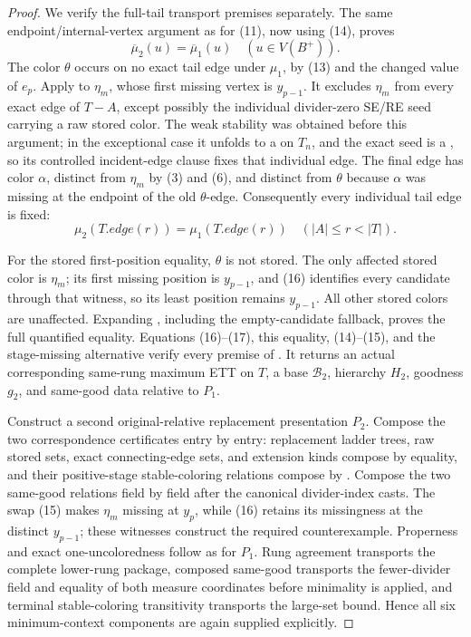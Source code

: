 \begin{proof}
We verify the full-tail transport premises separately.  The same
endpoint/internal-vertex argument as for (11), now using (14), proves
\[
 \overline\mu_2(u)=\overline\mu_1(u)
                    \quad(u\in V(B^+)).                     \tag{16}
\]
The color \(\theta\) occurs on no exact tail edge under \(\mu_1\), by
(13) and the changed value of \(e_p\).  Apply
 to \(\eta_m\), whose first
missing vertex is \(y_{p-1}\).  It excludes \(\eta_m\) from every exact
edge of \(T-A\), except possibly the individual divider-zero SE/RE seed
carrying a raw stored color.  The weak stability was obtained before this
argument; in the exceptional case it unfolds to a
 on \(T_n\), and the exact seed is a
, so its controlled incident-edge clause fixes
that individual edge.  The final edge has color \(\alpha\), distinct
from \(\eta_m\) by (3) and (6), and distinct from \(\theta\) because
\(\alpha\) was missing at the endpoint of the old \(\theta\)-edge.
Consequently every individual tail edge is fixed:
\[
 \mu_2(T.\mathit{edge}(r))=\mu_1(T.\mathit{edge}(r))
                    \quad(|A|\le r<|T|).                    \tag{17}
\]

For the stored first-position equality, \(\theta\) is not stored.  The
only affected stored color is \(\eta_m\); its first missing position is
\(y_{p-1}\), and (16) identifies every candidate through that witness,
so its least position remains \(y_{p-1}\).  All other stored colors are
unaffected.  Expanding , including
the empty-candidate fallback, proves the full quantified equality.
Equations (16)--(17), this equality, (14)--(15), and the stage-missing
alternative verify every premise of
.  It returns an actual
corresponding same-rung maximum ETT on \(T\), a base
\(\mathcal B_2\), hierarchy \(H_2\), goodness \(g_2\), and same-good
data relative to \(P_1\).

Construct a second original-relative replacement presentation \(P_2\).
Compose the two correspondence certificates entry by entry: replacement
ladder trees, raw stored sets, exact connecting-edge sets, and extension
kinds compose by equality, and their positive-stage stable-coloring
relations compose by .  Compose the two same-good relations
field by field after the canonical divider-index casts.  The swap (15)
makes \(\eta_m\) missing at \(y_p\), while (16) retains its missingness
at the distinct \(y_{p-1}\); these witnesses construct the required
counterexample.  Properness and exact one-uncoloredness follow as for
\(P_1\).  Rung agreement transports the complete lower-rung package,
composed same-good transports the fewer-divider field and equality of
both measure coordinates before minimality is applied, and terminal
stable-coloring transitivity transports the large-set bound.  Hence all
six minimum-context components are again supplied explicitly.


\end{proof}
